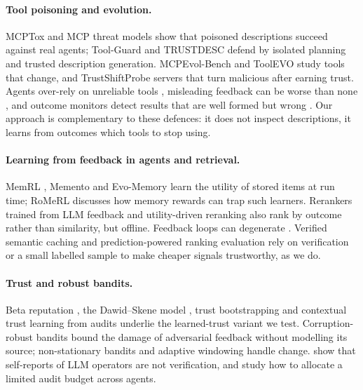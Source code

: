 \documentclass[11pt]{article}
\begin{document}
\paragraph{Tool poisoning and evolution.} MCPTox \citep{mcptox} and MCP threat models
\citep{mcpthreat} show that poisoned descriptions succeed against real agents; Tool-Guard
\citep{toolguard} and TRUSTDESC \citep{trustdesc} defend by isolated planning and trusted
description generation. MCPEvol-Bench \citep{mcpevol} and ToolEVO \citep{toolevo} study tools
that change, and TrustShiftProbe \citep{trustshift} servers that turn malicious after earning
trust. Agents over-rely on unreliable tools \citep{overreliance}, misleading feedback can be
worse than none \citep{blindtrust}, and outcome monitors detect results that are well formed but
wrong \citep{outcomemon}. Our approach is complementary to these defences: it does not inspect
descriptions, it learns from outcomes which tools to stop using.

\paragraph{Learning from feedback in agents and retrieval.} MemRL \citep{memrl}, Memento
\citep{memento} and Evo-Memory \citep{evomemory} learn the utility of stored items at run time;
RoMeRL \citep{romerl} discusses how memory rewards can trap such learners. Rerankers trained
from LLM feedback \citep{rrpo} and utility-driven reranking \citep{lurerag} also rank by outcome
rather than similarity, but offline. Feedback loops can degenerate \citep{degenerate}. Verified
semantic caching \citep{vcache} and prediction-powered ranking evaluation \citep{precise} rely on
verification or a small labelled sample to make cheaper signals trustworthy, as we do.

\paragraph{Trust and robust bandits.} Beta reputation \citep{josang2002}, the Dawid--Skene model
\citep{dawid1979,whitehill2009}, trust bootstrapping \citep{fltrust} and contextual trust
learning from audits \citep{esa} underlie the learned-trust variant we test. Corruption-robust
bandits \citep{corruption} bound the damage of adversarial feedback without modelling its source;
non-stationary bandits \citep{garivier,dts} and adaptive windowing \citep{bifet2007} handle
change. \citet{selfreports} show that self-reports of LLM operators are not verification, and
\citet{auditbudget} study how to allocate a limited audit budget across agents.
\end{document}
